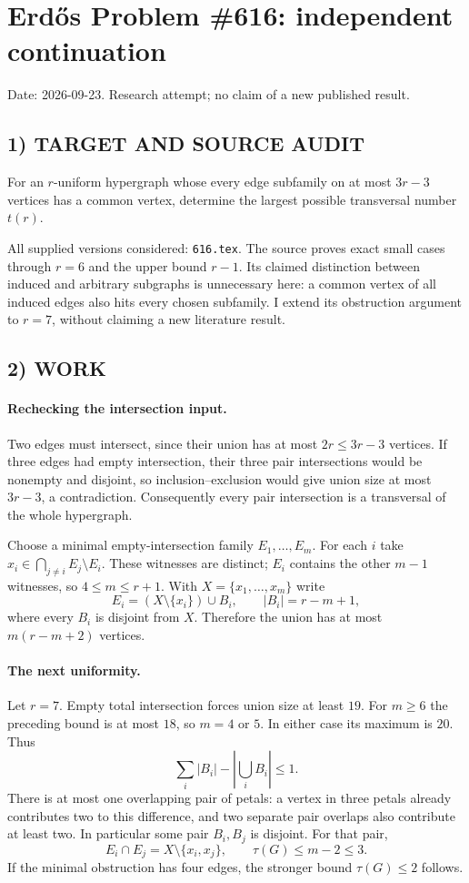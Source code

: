 \section{Erd\H{o}s Problem \#616: independent continuation}
\noindent Date: 2026-09-23. Research attempt; no claim of a new published result.
\subsection{1) TARGET AND SOURCE AUDIT}
For an $r$-uniform hypergraph whose every edge subfamily on at most $3r-3$ vertices has a common vertex, determine the largest possible transversal number $t(r)$.

All supplied versions considered: \texttt{616.tex}.
The source proves exact small cases through $r=6$ and the upper bound $r-1$. Its claimed distinction between induced and arbitrary subgraphs is unnecessary here: a common vertex of all induced edges also hits every chosen subfamily. I extend its obstruction argument to $r=7$, without claiming a new literature result.
\subsection{2) WORK}
\paragraph{Rechecking the intersection input.}
Two edges must intersect, since their union has at most $2r\le3r-3$ vertices. If three edges had empty intersection, their three pair intersections would be nonempty and disjoint, so inclusion--exclusion would give union size at most $3r-3$, a contradiction. Consequently every pair intersection is a transversal of the whole hypergraph.

Choose a minimal empty-intersection family $E_1,\ldots,E_m$. For each $i$ take $x_i\in\bigcap_{j\ne i}E_j\setminus E_i$. These witnesses are distinct; $E_i$ contains the other $m-1$ witnesses, so $4\le m\le r+1$. With $X=\{x_1,\ldots,x_m\}$ write
\[
E_i=(X\setminus\{x_i\})\cup B_i,\qquad |B_i|=r-m+1,
\]
where every $B_i$ is disjoint from $X$. Therefore the union has at most $m(r-m+2)$ vertices.

\paragraph{The next uniformity.}
Let $r=7$. Empty total intersection forces union size at least $19$. For $m\ge6$ the preceding bound is at most $18$, so $m=4$ or $5$. In either case its maximum is $20$. Thus
\[
\sum_i|B_i|-\left|\bigcup_i B_i\right|\le1.
\]
There is at most one overlapping pair of petals: a vertex in three petals already contributes two to this difference, and two separate pair overlaps also contribute at least two. In particular some pair $B_i,B_j$ is disjoint. For that pair,
\[
E_i\cap E_j=X\setminus\{x_i,x_j\},\qquad \tau(G)\le m-2\le3.
\]
If the minimal obstruction has four edges, the stronger bound $\tau(G)\le2$ follows.

